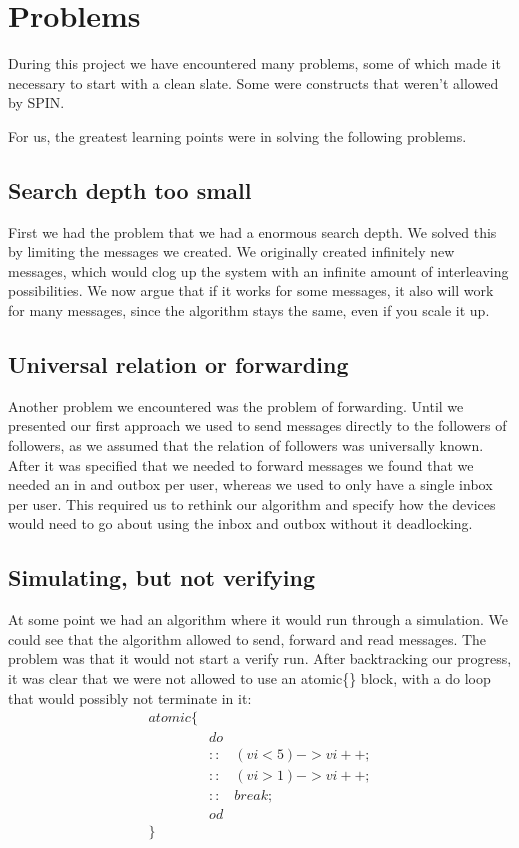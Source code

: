 \documentclass[9pt,a4paper]{article}
\begin{document}
	\section{Problems}
	
	During this project we have encountered many problems, some of which made it necessary to start with a clean slate. Some were constructs that weren't allowed by SPIN.
	
	For us, the greatest learning points were in solving the following problems.
	
	\subsection{Search depth too small}
	First we had the problem that we had a enormous search depth. We solved this by limiting the messages we created. 
	We originally created infinitely new messages, which would clog up the system with an infinite amount of interleaving possibilities.
	We now argue that if it works for some messages, it also will work for many messages, since the algorithm stays the same, even if you scale it up.
	
	\subsection{Universal relation or forwarding}
	Another problem we encountered was the problem of forwarding.
	Until we presented our first approach we used to send messages directly to the followers of followers, as we assumed that the relation of followers was universally known. 
	After it was specified that we needed to forward messages we found that we needed an in and outbox per user, whereas we used to only have a single inbox per user.
	This required us to rethink our algorithm and specify how the devices would need to go about using the inbox and outbox without it deadlocking.
	
	\subsection{Simulating, but not verifying}
	At some point we had an algorithm where it would run through a simulation. 
	We could see that the algorithm allowed to send, forward and read messages. 
	The problem was that it would not start a verify run.
	After backtracking our progress, it was clear that we were not allowed to use an atomic\{\} block, with a do loop that would possibly not terminate in it:
	\begin{align*}
	atomic \{ & & \\
	&do & \\
	&:: & (vi < 5) -> vi++; \\
	&:: & (vi > 1) -> vi++;  \\
	&:: & break; \\
	& od & \\
	\} & &
	\end{align*}
	
\end{document}
